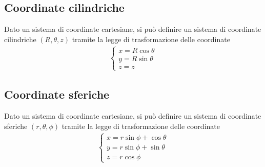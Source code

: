 \documentclass[letterpaper,10pt,english]{jupyterBook}
\begin{document}
\subsection{Coordinate cilindriche}
\label{\detokenize{ch/analytic_geometry/analytic_geometry_3d/points:coordinate-cilindriche}}
\sphinxAtStartPar
Dato un sistema di coordinate cartesiane, si può definire un sistema di coordinate cilindriche \((R, \theta, z)\) tramite la legge di trasformazione delle coordinate
\begin{equation*}
\begin{split}\begin{cases}
x = R \cos \theta \\
y = R \sin \theta \\
z = z
\end{cases}\end{split}
\end{equation*}

\subsection{Coordinate sferiche}
\label{\detokenize{ch/analytic_geometry/analytic_geometry_3d/points:coordinate-sferiche}}
\sphinxAtStartPar
Dato un sistema di coordinate cartesiane, si può definire un sistema di coordinate sferiche \((r, \theta, \phi)\) tramite la legge di trasformazione delle coordinate
\begin{equation*}
\begin{split}\begin{cases}
x = r \sin \phi + \cos \theta \\
y = r \sin \phi + \sin \theta \\
z = r \cos \phi
\end{cases}\end{split}
\end{equation*}
\sphinxstepscope
\end{document}

